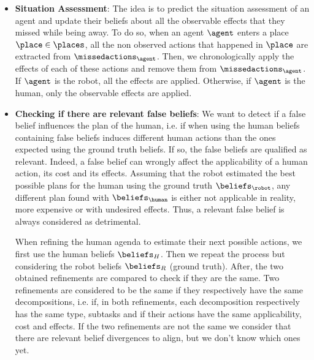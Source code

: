\begin{itemize}
    \item \textbf{Situation Assessment}: 
    The idea is to predict the situation assessment of an agent and update their beliefs about all the observable effects that they missed while being away. 
    To do so, when an agent $\agent$ enters a place $\place\in\places$, all the non observed actions that happened in $\place$ are extracted from $\missedactions_\agent$. Then, we chronologically apply the effects of each of these actions and remove them from $\missedactions_\agent$. If $\agent$ is the robot, all the effects are applied. Otherwise, if $\agent$ is the human, only the observable effects are applied. 
    
    \item \textbf{Checking if there are relevant false beliefs}: 
    We want to detect if a false belief influences the plan of the human, i.e. if when using the human beliefs containing false beliefs induces different human actions than the ones expected using the ground truth beliefs. If so, the false beliefs are qualified as relevant. Indeed, a false belief can wrongly affect the applicability of a human action, its cost and its effects. Assuming that the robot estimated the best possible plans for the human using the ground truth $\beliefs_\robot$, any different plan found with $\beliefs_\human$ is either not applicable in reality, more expensive or with undesired effects. Thus, a relevant false belief is always considered as detrimental.

    When refining the human agenda to estimate their next possible actions, we first use the human beliefs $\beliefs_H$. Then we repeat the process but considering the robot beliefs $\beliefs_R$ (ground truth). After, the two obtained refinements are compared to check if they are the same. Two refinements are considered to be the same if they respectively have the same decompositions, i.e. if, in both refinements, each decomposition respectively has the same type, subtasks and if their actions have the same applicability, cost and effects. If the two refinements are not the same we consider that there are relevant belief divergences to align, but we don't know which ones yet.
    

\end{itemize}

